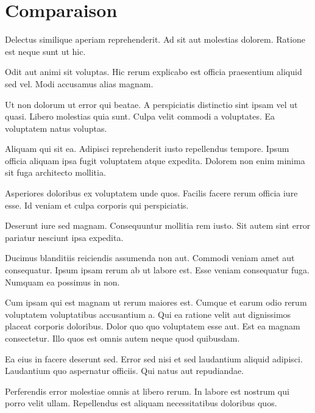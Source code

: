 \chapter{Comparaison}\label{chap:cp}

\renewcommand\chapterpath{Main/Comparaison}
\renewcommand\chapterfig{Main/Comparaison/Figures}

%

Delectus similique aperiam reprehenderit. Ad sit aut molestias dolorem. Ratione est neque sunt ut hic.

Odit aut animi sit voluptas. Hic rerum explicabo est officia praesentium aliquid sed vel. Modi accusamus alias magnam.

Ut non dolorum ut error qui beatae. A perspiciatis distinctio sint ipsam vel ut quasi. Libero molestias quia sunt. Culpa velit commodi a voluptates. Ea voluptatem natus voluptas.

Aliquam qui sit ea. Adipisci reprehenderit iusto repellendus tempore. Ipsum officia aliquam ipsa fugit voluptatem atque expedita. Dolorem non enim minima sit fuga architecto mollitia.

Asperiores doloribus ex voluptatem unde quos. Facilis facere rerum officia iure esse. Id veniam et culpa corporis qui perspiciatis.

Deserunt iure sed magnam. Consequuntur mollitia rem iusto. Sit autem sint error pariatur nesciunt ipsa expedita.

Ducimus blanditiis reiciendis assumenda non aut. Commodi veniam amet aut consequatur. Ipsum ipsam rerum ab ut labore est. Esse veniam consequatur fuga. Numquam ea possimus in non.

Cum ipsam qui est magnam ut rerum maiores est. Cumque et earum odio rerum voluptatem voluptatibus accusantium a. Qui ea ratione velit aut dignissimos placeat corporis doloribus. Dolor quo quo voluptatem esse aut. Est ea magnam consectetur. Illo quos est omnis autem neque quod quibusdam.

Ea eius in facere deserunt sed. Error sed nisi et sed laudantium aliquid adipisci. Laudantium quo aspernatur officiis. Qui natus aut repudiandae.

Perferendis error molestiae omnis at libero rerum. In labore est nostrum qui porro velit ullam. Repellendus est aliquam necessitatibus doloribus quos.
